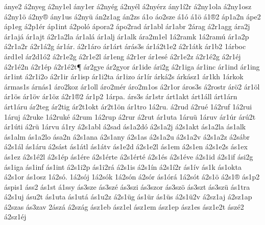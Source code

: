 {^^e1nye2
^^e12nyeg
^^e12ny1el
^^e1ny1er
^^e12ny^^e9g
^^e12ny^^e9l
^^e12ny^^e9rz
^^e1ny1^^ed2r
^^e12ny1ola
^^e12ny1osz
^^e12ny1^^f6
^^e12ny^^ae
^^e1ny1us
^^e12ny^^fc
^^e1n2z1ag
^^e1n2zs
^^e11o
^^e1o2sze
^^e11^^f3
^^e11^^f6
^^e11^^ae2
^^e1p1a2n
^^e1pe2
^^e1p1eg
^^e12p1^^e9r
^^e1p1int
^^e12pol^^f3
^^e1pora2
^^e1po2rad
^^e1r1abl
^^e1r1abr
2^^e1rag
^^e12r1agg
^^e1ra2j
^^e1r1aj^^e1
^^e1r1ajt
^^e12r1a2la
^^e1r1al^^e1
^^e1r1alj
^^e1r1alk
^^e1ra2m1el
1^^e12ramk
1^^e12ram^^fa
^^e1r1a2p
^^e12r1a2r
^^e12r1^^e12g
^^e1r1^^e1r.
^^e12r1^^e1ro
^^e1r1^^e1rt
^^e1r^^e1s3s
^^e1r1^^e12t1e2
^^e12r1^^e1tk
^^e1r1b2
1^^e1rboc
^^e1rd1el
^^e1r2d1^^f32
^^e12r1e2g
^^e12r1e2l
^^e1r1eng
^^e12r1er
^^e1r1es^^e9
^^e12r1e2z
^^e12r1^^e92g
^^e12r1^^e9j
^^e12r1^^e92n
^^e12r1^^e9p
^^e12r1^^e92t^^b6
^^e1r2gye
^^e1r2gyor
^^e1r1ide
^^e1ri2g
^^e12r1iga
^^e1r1inc
^^e1r1ind
^^e1r1ing
^^e1r1int
^^e12r1i2o
^^e12r1ir
^^e1r1isp
^^e1r1i2ta
^^e1r1izo
^^e1r1^^edr
^^e1rk^^e12s
^^e1rk^^e1sz1
^^e1r1kh
1^^e1rkok
^^e1rmas1s
^^e1rn^^e1s1
^^e1ro2koz
^^e1r1oll
^^e1ro2m^^e9r
^^e1ro2m1os
^^e12r1or
^^e1ros3s
^^e12rostr
^^e1r^^f62
^^e1r1^^f6l
^^e1r1^^f6s
^^e1r1^^f6v
^^e1r1^^f6z
^^e12r1^^ae2
^^e1r1p2
1^^e1rpa.
^^e1rs3s
^^e1r1str
^^e1rt1akt
^^e1rt1^^e1ll
^^e1rt1^^e1rn
^^e1rt1^^e1ru
^^e1r2teg
^^e1r2tig
^^e1r2t1okt
^^e1r2t1^^f6n
^^e1r1tro
1^^e12ru.
^^e12rud
^^e12ru^^e9
1^^e12ruf
1^^e12rui
1^^e1ruj
^^e12ruke
1^^e12ruk^^e9
^^e12rum
1^^e12rup
^^e12rur
^^e12rut
^^e1r1uta
1^^e1ru^^fc
1^^e1ruv
^^e1r1^^far
^^e1r^^fa2t
^^e1r1^^fati
^^e12r^^fc
1^^e1rvu
^^e11ry
^^e12s1abl
^^e12sad
^^e1s1a2d^^f3
^^e12s1a2j
^^e12s1akt
^^e1s1a2la
^^e1s1alk
^^e1s1alm
^^e1s1a2lo
^^e1sa2n
^^e12s1ana
^^e12s1any
^^e12s1as
^^e12s1a2u
^^e12s1a2v
^^e12s1a2z
^^e12s^^e1br
^^e12s1^^e1l
^^e1s1^^e1ru
^^e12s^^e1st
^^e1s1^^e1tl
^^e1s1^^e1tv
^^e1s1e2d
^^e12s1e2l
^^e1s1em
^^e12s1en
^^e12s1e2s
^^e1s1ex
^^e1s1ez
^^e12s1^^e92l
^^e12s1^^e9p
^^e1s1^^e9re
^^e12s1^^e9rte
^^e12s1^^e9rt^^e9
^^e12s1^^e9s
^^e12s1^^e9ve
^^e12s1id
^^e12s1if
^^e1si2g
^^e1s1iga
^^e1s1inf
^^e1s1int
^^e12s1i2p
^^e1s1i2r^^e1
^^e12s1is
^^e12s1^^edn
^^e12s1^^ed2r
^^e1s1^^edv
^^e1s1k
^^e1s1okta
^^e12s1or
^^e1s1osz
1^^e12s^^f3.
1^^e12s^^f3j
1^^e12s^^f3k
1^^e12s^^f3n
^^e12s^^f3r
^^e1s1^^f3r^^e1
1^^e12s^^f3t
^^e12s1^^f6
^^e12s1^^ae
^^e1s1p2
^^e1spis1
^^e1ss2
^^e1s1st
^^e11ssy
^^e1s3sze
^^e1s3sz^^e9
^^e1s3szi
^^e1s3szor
^^e1s3sz^^f6
^^e1s3szt
^^e1s3sz^^fc
^^e1s1tra
^^e12s1uj
^^e1su2t
^^e1s1uta
^^e1s1ut^^e1
^^e1s1u2z
^^e12s1^^fcg
^^e1s1^^fcr
^^e1s1^^fcs
^^e12s1^^fc2v
^^e12sz1aj
^^e12sz1ap
^^e12szas
^^e1s3zav
2^^e1sz^^e1
^^e12sz^^e1g
^^e1sz1eb
^^e1sz1el
^^e1sz1em
^^e1sz1ep
^^e1sz1es
^^e1sz1e2t
^^e1sz^^e92
^^e12sz1^^e9j
}
